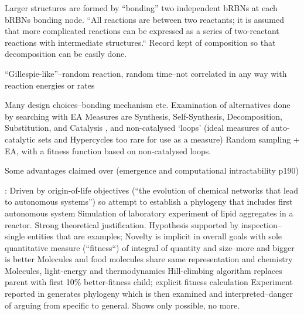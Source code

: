 \begin{NOTES}
Larger structures are formed by ``bonding'' two independent bRBNs at each bRBNs bonding node. ``All reactions are between two reactants; it is assumed that more complicated reactions can be expressed as a series of two-reactant reactions with intermediate structures.`` Record kept of composition so that decomposition can be easily done.

``Gillespie-like''--random reaction, random time--not correlated in any way with reaction energies or rates \parencite[chap.8]{Faulconbridge2011}

Many design choices--bonding mechanism etc. Examination of alternatives done by searching with EA
Measures are Synthesis, Self-Synthesis, Decomposition, Substitution, and Catalysis \parencite[chap.7]{Faulconbridge2011}, and non-catalysed `loops' (ideal measures of auto-catalytic sets and Hypercycles too rare for use as a measure) \parencite[chap.8]{Faulconbridge2011}
Random sampling + EA, with a fitness function based on non-catalysed loops.

Some advantages claimed over \cite{Hutton2007} (emergence and computational intractability p190)


\cite{Fernando:2008xy,Fernando:2007pf}:
Driven by origin-of-life objectives (``the evolution of chemical networks that lead to autonomous systems'') so attempt to establish a phylogeny that includes first autonomous system
Simulation of laboratory experiment of lipid aggregates in a reactor. Strong theoretical justification. Hypothesis supported by inspection--single entities that are examples; Novelty is implicit in overall goals with sole quantitative measure (``fitness``) of integral of quantity and size--more and bigger is better
Molecules and food molecules share same representation and chemistry
Molecules, light-energy and thermodynamics
Hill-climbing algorithm replaces parent with first 10\% better-fitness child; explicit fitness calculation
Experiment reported in \textcite{Fernando:2008xy} generates phylogeny which is then examined and interpreted--danger of arguing from specific to general. Shows only possible, no more.
\end{NOTES}

